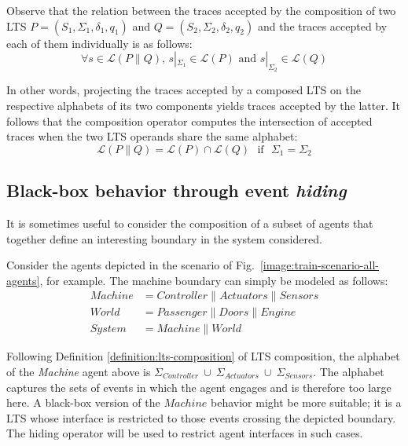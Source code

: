 Observe that the relation between the traces accepted by the composition of two LTS $P = (S_1,\Sigma_1,\delta_1,q_{1})$ and $Q = (S_2,\Sigma_2,\delta_2,q_{2})$ and the traces accepted by each of them individually is as follows:
\begin{equation*}
\forall s \in \mathcal{L}(P \parallel Q)\mbox{,~} s|_{\Sigma_1} \in \mathcal{L}(P) \mbox{~and~} s|_{\Sigma_2} \in \mathcal{L}(Q)
\end{equation*}

In other words, projecting the traces accepted by a composed LTS on the respective alphabets of its two components yields traces accepted by the latter. It follows that the composition operator computes the intersection of accepted traces when the two LTS operands share the same alphabet:
\begin{equation*}
\mathcal{L}(P \parallel Q) = \mathcal{L}(P) \cap \mathcal{L}(Q) \mbox{~~if~~} \Sigma_{1}=\Sigma_{2}
\end{equation*}

\subsection{Black-box behavior through event \emph{hiding}\label{subsection:lts-hiding}}

It is sometimes useful to consider the composition of a subset of agents that together define an interesting boundary in the system considered. 

Consider the agents depicted in the scenario of Fig.~\ref{image:train-scenario-all-agents}, for example. The machine boundary can simply be modeled as follows:
\begin{align*}
Machine &= Controller \parallel Actuators \parallel Sensors \\
World   &= Passenger \parallel Doors \parallel Engine \\
System  &= Machine \parallel World
\end{align*}

Following Definition \ref{definition:lts-composition} of LTS composition, the alphabet of the \emph{Machine} agent above is $\Sigma_{Controller}~\cup~\Sigma_{Actuators}~\cup~\Sigma_{Sensors}$. The alphabet captures the sets of events in which the agent engages and is therefore too large here. A black-box version of the $Machine$ behavior might be more suitable; it is a LTS whose interface is restricted to those events crossing the depicted boundary. The hiding operator will be used to restrict agent interfaces in such cases.

